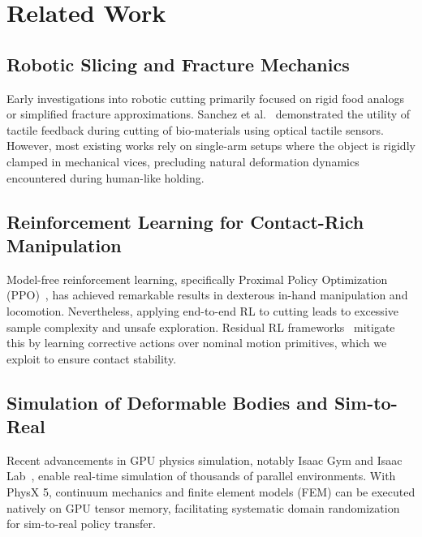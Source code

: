 \section{Related Work}
\label{sec:related_work}

\subsection{Robotic Slicing and Fracture Mechanics}
Early investigations into robotic cutting primarily focused on rigid food analogs or simplified fracture approximations. Sanchez et al.~\cite{sanchez2021tacblade} demonstrated the utility of tactile feedback during cutting of bio-materials using optical tactile sensors. However, most existing works rely on single-arm setups where the object is rigidly clamped in mechanical vices, precluding natural deformation dynamics encountered during human-like holding.

\subsection{Reinforcement Learning for Contact-Rich Manipulation}
Model-free reinforcement learning, specifically Proximal Policy Optimization (PPO)~\cite{schulman2017proximal}, has achieved remarkable results in dexterous in-hand manipulation and locomotion. Nevertheless, applying end-to-end RL to cutting leads to excessive sample complexity and unsafe exploration. Residual RL frameworks~\cite{johannink2019residual} mitigate this by learning corrective actions over nominal motion primitives, which we exploit to ensure contact stability.

\subsection{Simulation of Deformable Bodies and Sim-to-Real}
Recent advancements in GPU physics simulation, notably Isaac Gym and Isaac Lab~\cite{makoviychuk2021isaac}, enable real-time simulation of thousands of parallel environments. With PhysX 5, continuum mechanics and finite element models (FEM) can be executed natively on GPU tensor memory, facilitating systematic domain randomization for sim-to-real policy transfer.
